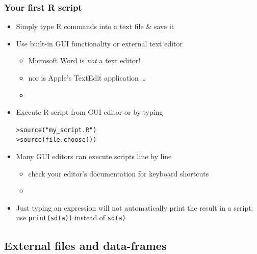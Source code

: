 \documentclass[t]{beamer} %
\begin{document}
\begin{frame}[fragile]
  \frametitle{Your first R script}

  \begin{itemize}
  \item Simply type R commands into a text file \& save it
  \item Use built-in GUI functionality or external text editor
    \begin{itemize}
    \item Microsoft Word is \emph{not} a text editor!
    \item nor is Apple's TextEdit application \ldots
    \item[]
    \end{itemize}
  \item Execute R script from GUI editor or by typing
    \begin{alltt}
> source("my_script.R") 
> source(file.choose()) 
    \end{alltt}
  \item Many GUI editors can execute scripts line by line
    \begin{itemize}
    \item check your editor's documentation for keyboard shortcuts
    \item[]
    \end{itemize}
  \item Just typing an expression will not automatically print the result in a
    script: use \verb_print(sd(a))_ instead of \verb_sd(a)_
  \end{itemize}
\end{frame}

\subsection{External files and data-frames}
\end{document}
